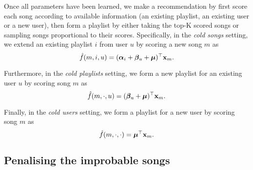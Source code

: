 Once all parameters have been learned, 
we make a recommendation by first score each song according to available information (\eg an existing playlist, an existing user or a new user),
then form a playlist by either taking the top-K scored songs or sampling songs proportional to their scores.
Specifically, in the {\it cold songs} setting, 
we extend an existing playlist $i$ from user $u$ by scoring a new song $m$ as
$$
\hat f(m, i, u) = ({\bm{\alpha}}_i + {\bm{\beta}}_u + \bm{\mu})^\top \mathbf{x}_m.
$$

Furthermore, in the {\it cold playlists} setting, 
we form a new playlist for an existing user $u$ by scoring song $m$ as
$$
\hat f(m, \cdot, u) = ({\bm{\beta}}_u + \bm{\mu})^\top \mathbf{x}_m.
$$

Finally, in the {\it cold users} setting, 
we form a playlist for a new user by scoring song $m$ as
$$
\hat f(m, \cdot, \cdot) = \bm{\mu}^\top \mathbf{x}_m.
$$




\subsection{Penalising the improbable songs}
\label{ssec:bploss}

